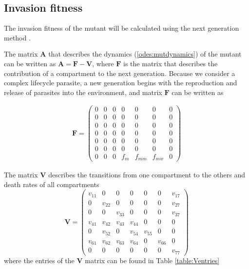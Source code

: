 \documentclass{article}
\begin{document}
\subsection{Invasion fitness}
The invasion fitness of the mutant will be calculated using the next generation method \citep{hurford:JRSI:2010}.

The matrix $\mathbf{A}$ that describes the dynamics (\ref{odes:mutdynamics}) of the mutant can be written as $\mathbf{A} = \mathbf{F} - \mathbf{V}$, where $\mathbf{F}$ is the matrix that describes the contribution of a compartment to the next generation. Because we consider a complex lifecycle parasite, a new generation begins with the reproduction and release of parasites into the environment, and matrix $\mathbf{F}$ can be written as

\begin{align*}
    \mathbf{F} = 
    \begin{pmatrix}
   	 0 & 0 & 0 & 0   & 0 	  & 0 	   & 0 \\
	 0 & 0 & 0 & 0   & 0 	  & 0 	   & 0 \\
	 0 & 0 & 0 & 0   & 0 	  & 0 	   & 0 \\
	 0 & 0 & 0 & 0   & 0      & 0	   & 0 \\
	 0 & 0 & 0 & 0   & 0      & 0      & 0 \\ 
	 0 & 0 & 0 & 0   & 0      & 0      & 0 \\
	 0 & 0 & 0 & f_m & f_{mm} & f_{mw} & 0
    \end{pmatrix}
\end{align*}

The matrix $\mathbf{V}$ describes the transitions from one compartment to the others and death rates of all compartments
\[
    \mathbf{V} = 
    \begin{pmatrix*}
     v_{11}  & 0 & 0 & 0 & 0 & 0 & v_{17} \\
     0  &  v_{22} & 0 & 0 & 0 & 0 & v_{27} \\ 
     0  &  0  &  v_{33} &  0  &  0  &  0  & v_{37} \\
    v_{41}  &  v_{42} & v_{43} &  v_{44} &  0 & 0 & 0 \\
     0 & v_{52}  &  0  & v_{54} &  v_{55} & 0 & 0  \\
     v_{61} & v_{62} & v_{63} & v_{64}  &  0  & v_{66} & 0 \\
     0  &  0  &  0  &  0  &  0  &  0  &  v_{77}
    \end{pmatrix*}
\]
where the entries of the $\mathbf{V}$ matrix can be found in Table \ref{table:Ventries}
\end{document}

